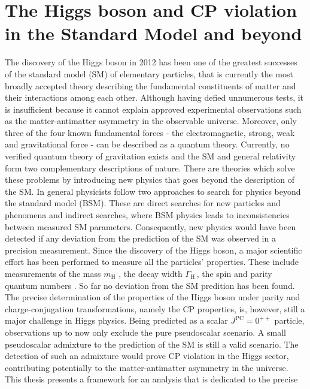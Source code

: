 
\chapter{The Higgs boson and CP violation in the Standard Model and beyond}

The discovery of the Higgs boson in 2012 \cite{Aad:2012tfa,Chatrchyan:2012xdj} has been one of the greatest successes of the standard model (SM) of elementary particles, that is currently the most broadly accepted theory describing the fundamental constituents of matter and 
their interactions among each other. Although having defied unnumerous tests, it is insufficient because it cannot explain approved experimental observations such as the matter-antimatter asymmetry in the observable universe. 
Moreover, only three of the four known fundamental forces - the electromagnetic, strong, weak and gravitational force - can be described as a quantum theory. 
Currently, no verified quantum theory of gravitation exists and the SM and general relativity form two complementary descriptions of nature.
There are theories which solve these problems by introducing new physics that goes beyond the description of the SM. In general physicists follow two approaches to search for physics beyond the standard model (BSM). These are direct searches for  new particles and phenomena and indirect searches, where 
BSM physics leads to inconsistencies between measured SM parameters. Consequently, new physics would have been detected if any deviation from the prediction of the SM was observed in a precision measurement. 
Since the discovery of the Higgs boson, a major scientific effort has been performed to measure all the particles' properties. These include measurements of the mass $m_\text{H}$ \cite{combined_mass_Higgs}, the decay width $\Gamma_\text{H}$\,\cite{atlas_Higgswidth}, the spin and parity quantum numbers \cite{Run1_spin_parity,Run1_spinparity_ATLAS}. So far no deviation from the SM predition has been found. 
The precise determination of the properties of the Higgs boson under parity and charge-conjugation transformations, namely the CP properties, is, however, still a major challenge in Higgs physics. Being predicted as a scalar $J^\text{PC}=0^{++}$ particle, 
observations up to now only exclude the pure pseudoscalar scenario. A small pseudoscalar admixture to the prediction of the SM is still a valid scenario. The detection of such an admixture would prove CP violation in the Higgs sector, contributing potentially to the matter-antimatter asymmetry in the universe. This thesis presents a framework for an analysis that is dedicated to the precise
